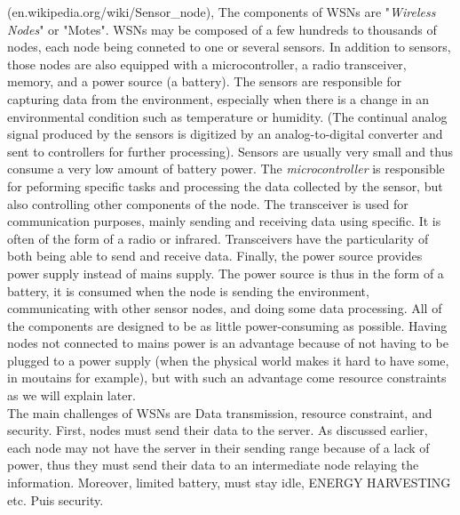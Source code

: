(en.wikipedia.org/wiki/Sensor\_node),
The components of WSNs are "\textit{Wireless Nodes}" or "Motes". WSNs may be composed of a few hundreds to thousands of nodes, each node being conneted to one or several sensors. In addition to sensors, those nodes are also equipped with a microcontroller, a radio transceiver, memory, and a power source (a battery). The sensors are responsible for capturing data from the environment, especially when there is a change in an environmental condition such as temperature or humidity. (The continual analog signal produced by the sensors is digitized by an analog-to-digital converter and sent to controllers for further processing). Sensors are usually very small and thus consume a very low amount of battery power. The \textit{microcontroller} is responsible for peforming specific tasks and processing the data collected by the sensor, but also controlling other components of the node. The transceiver is used for communication purposes, mainly sending and receiving data using specific. It is often of the form of a radio or infrared. Transceivers have the particularity of both being able to send and receive data. Finally, the power source provides power supply instead of mains supply. The power source is thus in the form of a battery, it is consumed when the node is sending the environment, communicating with other sensor nodes, and doing some data processing. All of the components are designed to be as little power-consuming as possible. Having nodes not connected to mains power is an advantage because of not having to be plugged to a power supply (when the physical world makes it hard to have some, in moutains for example), but with such an advantage come resource constraints as we will explain later.  \\

The main challenges of WSNs are Data transmission, resource constraint, and security. First, nodes must send their data to the server. As discussed earlier, each node may not have the server in their sending range because of a lack of power, thus they must send their data to an intermediate node relaying the information. Moreover, limited battery, must stay idle, ENERGY HARVESTING etc. Puis security.\\

